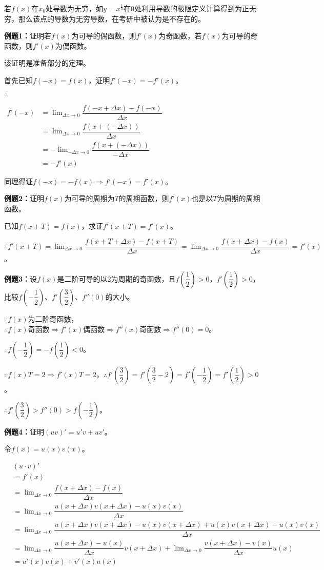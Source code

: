 \documentclass[UTF8]{ctexart}
\begin{document}
若$f(x)$在$x_0$处导数为无穷，如$y=x^{\frac{1}{3}}$在$0$处利用导数的极限定义计算得到为正无穷，那么该点的导数为无穷导数，在考研中被认为是不存在的。

\textbf{例题1：}证明若$f(x)$为可导的偶函数，则$f'(x)$为奇函数，若$f(x)$为可导的奇函数，则$f'(x)$为偶函数。

该证明是准备部分的定理。

首先已知$f(-x)=f(x)$，证明$f'(-x)=-f'(x)$。

$\therefore$

$
\begin{aligned}
    f'(-x) &=\lim_{\Delta x\to 0}\dfrac{f(-x+\Delta x)-f(-x)}{\Delta x} \\
    & =\lim_{\Delta x\to 0}\dfrac{f(x+(-\Delta x))}{\Delta x} \\
    & =-\lim_{-\Delta x\to 0}\dfrac{f(x+(-\Delta x))}{-\Delta x} \\
    & =-f'(x)
\end{aligned}
$

同理得证$f(-x)=-f(x)\Rightarrow f'(-x)=f'(x)$。

\textbf{例题2：}证明$f(x)$为可导的周期为$T$的周期函数，则$f'(x)$也是以$T$为周期的周期函数。

已知$f(x+T)=f(x)$，求证$f'(x+T)=f'(x)$。

$\therefore f'(x+T)=\lim_{\Delta x\to 0}\dfrac{f(x+T+\Delta x)-f(x+T)}{\Delta x}=\lim_{\Delta x\to 0}\dfrac{f(x+\Delta x)-f(x)}{\Delta x}=f'(x)$。

\textbf{例题3：}设$f(x)$是二阶可导的以2为周期的奇函数，且$f(\dfrac{1}{2})>0$，$f'(\dfrac{1}{2})>0$，比较$f(-\dfrac{1}{2})$、$f'(\dfrac{3}{2})$、$f''(0)$的大小。

$\because f(x)$为二阶奇函数，$\therefore f(x)\text{奇函数}\Rightarrow f'(x)\text{偶函数}\Rightarrow f''(x)\text{奇函数}\Rightarrow f''(0)=0$。

$\therefore f(-\dfrac{1}{2})=-f(\dfrac{1}{2})<0$。

$\because f(x)T=2\Rightarrow f'(x)T=2$，$\therefore f'(\dfrac{3}{2})=f'(\dfrac{3}{2}-2)=f'(-\dfrac{1}{2})=f'(\dfrac{1}{2})>0$。

$\therefore f'(\dfrac{3}{2})>f''(0)>f(-\dfrac{1}{2})$。

\textbf{例题4：}证明$(uv)'=u'v+uv'$。

令$f(x)=u(x)v(x)$。

$
\begin{aligned}
    & (u\cdot v)' \\
    & =f'(x) \\
    & =\lim_{\Delta x\to 0}\dfrac{f(x+\Delta x)-f(x)}{\Delta x} \\
    & =\lim_{\Delta x\to 0}\dfrac{u(x+\Delta x)v(x+\Delta x)-u(x)v(x)}{\Delta x} \\
    & =\lim_{\Delta x\to 0}\dfrac{u(x+\Delta x)v(x+\Delta x)-u(x)v(x+\Delta x)+u(x)v(x+\Delta x)-u(x)v(x)}{\Delta x} \\
    & =\lim_{\Delta x\to 0}\dfrac{u(x+\Delta x)-u(x)}{\Delta x}v(x+\Delta x) +\lim_{\Delta x\to 0}\dfrac{v(x+\Delta x)-v(x)}{\Delta x}u(x) \\
    & =u'(x)v(x)+v'(x)u(x)
\end{aligned}
$
\end{document}
